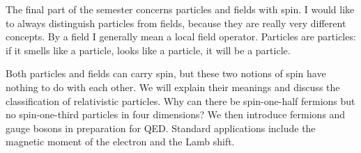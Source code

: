 The final part of the semester concerns particles
and fields with spin.
I would like to always distinguish particles from fields, because they are
really very different concepts. By a field I generally mean a local field
operator. Particles are particles: if it smells like a particle, looks like a
particle, it will be a particle.

Both particles and fields can carry spin, but these two notions of spin have
nothing to do with each other. We will explain their meanings and discuss
the classification of relativistic particles. Why can there be spin-one-half
fermions but no spin-one-third particles in four dimensions?
We then introduce fermions and gauge bosons in preparation for QED.
Standard applications include the magnetic moment of the electron and the Lamb
shift.

